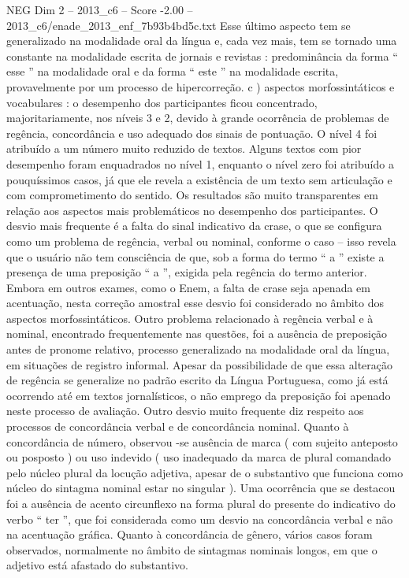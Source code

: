 \begin{textsample}{NEG Dim 2 – 2013\_c6 – Score -2.00 – 2013\_c6/enade\_2013\_enf\_7b93b4bd5c.txt}
Esse último aspecto tem se generalizado na modalidade oral da língua e, cada vez mais, tem se tornado uma constante na modalidade escrita de jornais e revistas : predominância da forma “ esse ” na modalidade oral e da forma “ este ” na modalidade escrita, provavelmente por um processo de hipercorreção. c ) aspectos morfossintáticos e vocabulares : o desempenho dos participantes ficou concentrado, majoritariamente, nos níveis 3 e 2, devido à grande ocorrência de problemas de regência, concordância e uso adequado dos sinais de pontuação.
O nível 4 foi atribuído a um número muito reduzido de textos.
Alguns textos com pior desempenho foram enquadrados no nível 1, enquanto o nível zero foi atribuído a pouquíssimos casos, já que ele revela a existência de um texto sem articulação e com comprometimento do sentido.
Os resultados são muito transparentes em relação aos aspectos mais problemáticos no desempenho dos participantes.
O desvio mais frequente é a falta do sinal indicativo da crase, o que se configura como um problema de regência, verbal ou nominal, conforme o caso – isso revela que o usuário não tem consciência de que, sob a forma do termo “ a ” existe a presença de uma preposição “ a ”, exigida pela regência do termo anterior.
Embora em outros exames, como o Enem, a falta de crase seja apenada em acentuação, nesta correção amostral esse desvio foi considerado no âmbito dos aspectos morfossintáticos.
Outro problema relacionado à regência verbal e à nominal, encontrado frequentemente nas questões, foi a ausência de preposição antes de pronome relativo, processo generalizado na modalidade oral da língua, em situações de registro informal.
Apesar da possibilidade de que essa alteração de regência se generalize no padrão escrito da Língua Portuguesa, como já está ocorrendo até em textos jornalísticos, o não emprego da preposição foi apenado neste processo de avaliação.
Outro desvio muito frequente diz respeito aos processos de concordância verbal e de concordância nominal.
Quanto à concordância de número, observou -se ausência de marca ( com sujeito anteposto ou posposto ) ou uso indevido ( uso inadequado da marca de plural comandado pelo núcleo plural da locução adjetiva, apesar de o substantivo que funciona como núcleo do sintagma nominal estar no singular ).
Uma ocorrência que se destacou foi a ausência de acento circunflexo na forma plural do presente do indicativo do verbo “ ter ”, que foi considerada como um desvio na concordância verbal e não na acentuação gráfica.
Quanto à concordância de gênero, vários casos foram observados, normalmente no âmbito de sintagmas nominais longos, em que o adjetivo está afastado do substantivo.

\end{textsample}
